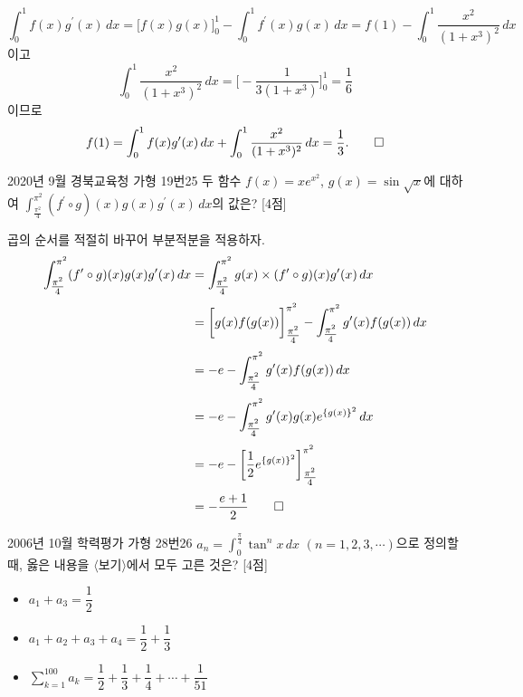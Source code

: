 \documentclass{article}
\begin{document}
\begin{sol}
	\[
		\int_0^1f(x)g^{\prime}(x)\,dx=\biggl[f(x)g(x)\biggr]_0^1-\int_0^1f^{\prime}(x)g(x)\,dx=f(1)-\int_0^1\frac{x^2}{(1+x^3)^2}\,dx
	\]
	이고
	\[
		\int_0^1\frac{x^2}{(1+x^3)^2}\,dx=\biggl[-\frac{1}{3(1+x^3)}\biggr]_0^1=\frac{1}{6}
	\]
	이므로
	\[
		f(1)=\int_0^1f(x)g^{\prime}(x)\,dx+\int_0^1\frac{x^2}{(1+x^3)^2}\,dx=\frac{1}{3}.\qed
	\]
\end{sol}

\newpage
\begin{prob}{2020년 9월 경북교육청 가형 19번}{25}
	두 함수 $f(x)=xe^{x^2}$, $g(x)=\sin\sqrt x$에 대하여 $\displaystyle\int_{\tfrac{\pi^2}{4}}^{\pi^2}(f^{\prime}\circ g)(x)g(x)g^{\prime}(x)\,dx$의 값은? [4점]
\end{prob}

\begin{sol}
	곱의 순서를 적절히 바꾸어 부분적분을 적용하자.
	\begin{align*}
		\int_{\tfrac{\pi^2}{4}}^{\pi^2}(f^{\prime}\circ g)(x)g(x)g^{\prime}(x)\,dx&=\int_{\tfrac{\pi^2}{4}}^{\pi^2}g(x)\times(f^{\prime}\circ g)(x)g^{\prime}(x)\,dx\\[3pt]
		&=\biggl[g(x)f(g(x))\biggr]_{\tfrac{\pi^2}{4}}^{\pi^2}-\int_{\tfrac{\pi^2}{4}}^{\pi^2}g^{\prime}(x)f(g(x))\,dx\\[3pt]
		&=-e-\int_{\tfrac{\pi^2}{4}}^{\pi^2}g^{\prime}(x)f(g(x))\,dx\\[3pt]
		&=-e-\int_{\tfrac{\pi^2}{4}}^{\pi^2}g^{\prime}(x)g(x)e^{\{g(x)\}^2}\,dx\\[3pt]
		&=-e-\biggl[\frac{1}{2}e^{\{g(x)\}^2}\biggr]_{\tfrac{\pi^2}{4}}^{\pi^2}\\[3pt]
		&=-\frac{e+1}{2}\qed
	\end{align*}
\end{sol}

\newpage
\begin{prob}{2006년 10월 학력평가 가형 28번}{26}
	$a_n=\displaystyle\int_0^{\tfrac{\pi}{4}}\tan^nx\,dx$ $(n=1,2,3,\cdots)$으로 정의할 때, 옳은 내용을 $\langle$보기$\rangle$에서 모두 고른 것은? [4점]
	\begin{hint}[보기]
		\begin{itemize}
			\item[ㄱ.] $a_1+a_3=\dfrac{1}{2}$
			\item[ㄴ.] $a_1+a_2+a_3+a_4=\dfrac{1}{2}+\dfrac{1}{3}$
			\item[ㄷ.] $\displaystyle\sum_{k=1}^{100}a_k=\dfrac{1}{2}+\dfrac{1}{3}+\dfrac{1}{4}+\cdots+\dfrac{1}{51}$
		\end{itemize}
	\end{hint}
\end{prob}
\end{document}
